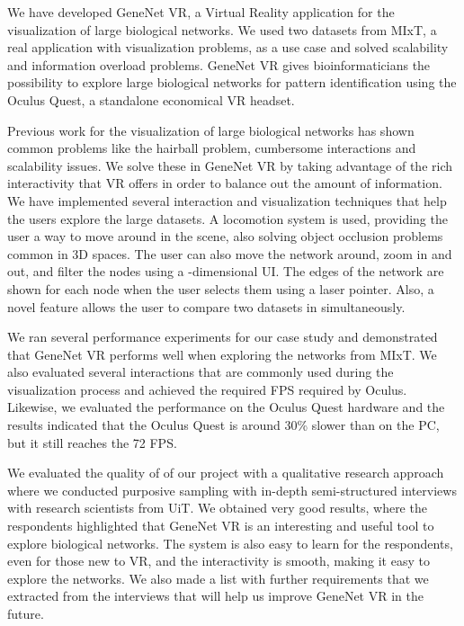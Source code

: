 We have developed GeneNet VR, a Virtual Reality application for the visualization of large biological networks. We used two datasets from MIxT, a real application with visualization problems, as a use case and solved scalability and information overload problems. GeneNet VR gives bioinformaticians the possibility to explore large biological networks for pattern identification using the Oculus Quest, a standalone economical VR headset.

Previous work for the visualization of large biological networks has shown common problems like the hairball problem, cumbersome interactions and scalability issues. We solve these in GeneNet VR by taking advantage of the rich interactivity that VR offers in order to balance out the amount of information. We have implemented several interaction and visualization techniques that help the users explore the large datasets. A locomotion system is used, providing the user a way to move around in the scene, also solving object occlusion problems common in 3D spaces. The user can also move the network around, zoom in and out, and filter the nodes using a -dimensional UI. The edges of the network are shown for each node when the user selects them using a laser pointer. Also, a novel feature allows the user to compare two datasets in simultaneously.

We ran several performance experiments for our case study and demonstrated that GeneNet VR performs well when exploring the networks from MIxT. We also evaluated several interactions that are commonly used during the visualization process and achieved the required FPS required by Oculus. Likewise, we evaluated the performance on the Oculus Quest hardware and the results indicated that the Oculus Quest is around 30\% slower than on the PC, but it still reaches the 72 FPS.

We evaluated the quality of of our project with a qualitative research approach where we conducted purposive sampling with in-depth semi-structured interviews with research scientists from UiT. We obtained very good results, where the respondents highlighted that GeneNet VR is an interesting and useful tool to explore biological networks. The system is also easy to learn for the respondents, even for those new to VR, and the interactivity is smooth, making it easy to explore the networks. We also made a list with further requirements that we extracted from the interviews that will help us improve GeneNet VR in the future.

